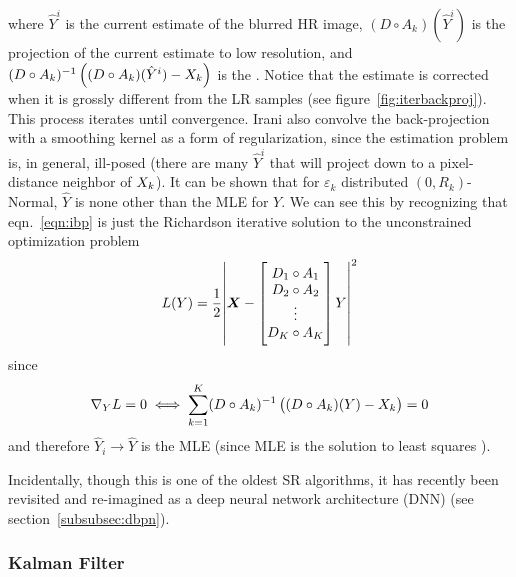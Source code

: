 where \(\hat{Y}^i\) is the current estimate of the blurred HR image, \((D \circ A_k)(\hat{Y}^i)\) is the projection of the current estimate to low resolution, and \((D \circ A_k)^{-1}\left( (D \circ A_k)(\hat{Y}^i) - X_k \right)\) is the .
Notice that the estimate is corrected when it is grossly different from the LR samples (see figure~\ref{fig:iterbackproj}).
%
This process iterates until convergence.
%
Irani \etal also convolve the back-projection with a smoothing kernel as a form of regularization, since the estimation problem is, in general, ill-posed (there are many \(\hat{Y}^{i}\) that will project down to a pixel-distance neighbor of \(X_k\)).
%
It can be shown \cite{Elad1996} that for \(\varepsilon_k\) distributed \((0, R_k)\)-Normal, \(\hat{Y}\) is none other than the MLE for \(Y\).
%
We can see this by recognizing that eqn.~\eqref{eqn:ibp} is just the Richardson iterative \cite{Anderssen:1972:RNM:891962} solution to the unconstrained optimization problem
\begin{equation}
    L(Y) = \frac{1}{2} \abs{ \bm{X} -  \begin{bmatrix}
            D_1 \circ A_1 \\
            D_2 \circ A_2 \\
            \vdots        \\
            D_K \circ A_K \\
        \end{bmatrix}  Y  }^2
    \label{eqn:l2regression}
\end{equation}
since
\begin{equation*}
    \nabla_{Y} L = 0
    \iff
    \sum_{k=1}^K (D \circ A_k)^{-1}\left( (D \circ A_k)(Y) - X_k \right) = 0
\end{equation*}
and therefore \(\hat{Y}_i \rightarrow \hat{Y}\) is the MLE (since MLE is the solution to least squares \cite{CaseBerg:01}).

Incidentally, though this is one of the oldest SR algorithms, it has recently been revisited and re-imagined as a deep neural network architecture (DNN) \cite{haris2018deep} (see section~\ref{subsubsec:dbpn}).

\subsubsection{Kalman Filter}

